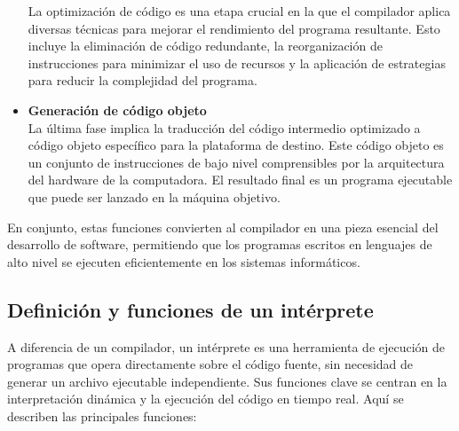 \begin{itemize}
  La optimización de código es una etapa crucial en la que el compilador aplica diversas técnicas para mejorar el rendimiento del programa resultante. Esto incluye la eliminación de código redundante, la reorganización de instrucciones para minimizar el uso de recursos y la aplicación de estrategias para reducir la complejidad del programa. \parencite{cooper2022}
  \item \textbf{Generación de código objeto} \\
  La última fase implica la traducción del código intermedio optimizado a código objeto específico para la plataforma de destino. Este código objeto es un conjunto de instrucciones de bajo nivel comprensibles por la arquitectura del hardware de la computadora. El resultado final es un programa ejecutable que puede ser lanzado en la máquina objetivo. \parencite{cooper2022}
\end{itemize}

En conjunto, estas funciones convierten al compilador en una pieza esencial del desarrollo de software, permitiendo que los programas escritos en lenguajes de alto nivel se ejecuten eficientemente en los sistemas informáticos.

\subsection{Definición y funciones de un intérprete}
A diferencia de un compilador, un intérprete es una herramienta de ejecución de programas que opera directamente sobre el código fuente, sin necesidad de generar un archivo ejecutable independiente. Sus funciones clave se centran en la interpretación dinámica y la ejecución del código en tiempo real. Aquí se describen las principales funciones:

